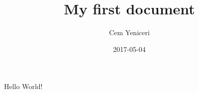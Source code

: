 \documentclass{article}
\title{My first document}
\date{2017-05-04}
\author{Cem Yeniceri}
\begin{document}
  \maketitle
  \newpage

  Hello World!
\end{document}
